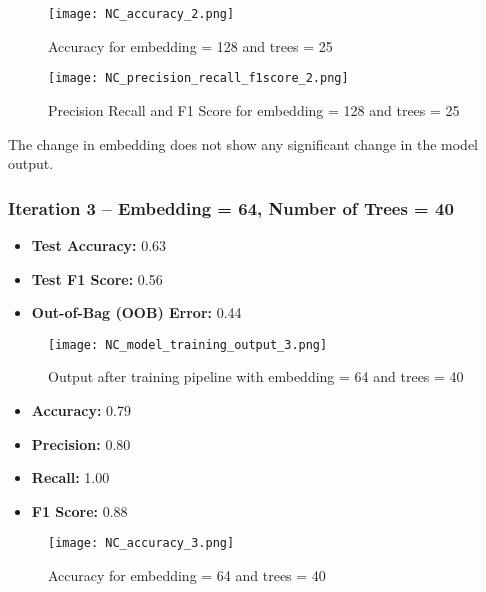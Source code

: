 \documentclass[conference, 12pt]{IEEEtran}
\begin{document}
\begin{figure}[H]
    \centering
    \texttt{[image: NC\_accuracy\_2.png]} %
    \caption{Accuracy for embedding = 128 and trees = 25}
    \label{fig:accuracy_2}
\end{figure}

\begin{figure}[H]
    \centering
    \texttt{[image: NC\_precision\_recall\_f1score\_2.png]} %
    \caption{Precision Recall and F1 Score for embedding = 128 and trees = 25}
    \label{fig:NC_Precision_Recall_2}
\end{figure}

The change in embedding does not show any significant change in the model output.\\

\subsubsection{Iteration 3 -- Embedding = 64, Number of Trees = 40}

\begin{itemize}
  \item \textbf{Test Accuracy:} 0.63
  \item \textbf{Test F1 Score:} 0.56
  \item \textbf{Out-of-Bag (OOB) Error:} 0.44
\end{itemize}

\begin{figure}[h]
  \centering
  \texttt{[image: NC\_model\_training\_output\_3.png]} 
  \caption{Output after training pipeline with embedding = 64 and trees = 40}
  \label{fig:classification_metrics_3}
\end{figure}

\begin{itemize}
  \item \textbf{Accuracy:} 0.79
  \item \textbf{Precision:} 0.80
  \item \textbf{Recall:} 1.00
  \item \textbf{F1 Score:} 0.88
\end{itemize}

\begin{figure}[h]
    \centering
    \texttt{[image: NC\_accuracy\_3.png]} %
    \caption{Accuracy for embedding = 64 and trees = 40}
    \label{fig:accuracy_3}
\end{figure}
\end{document}
